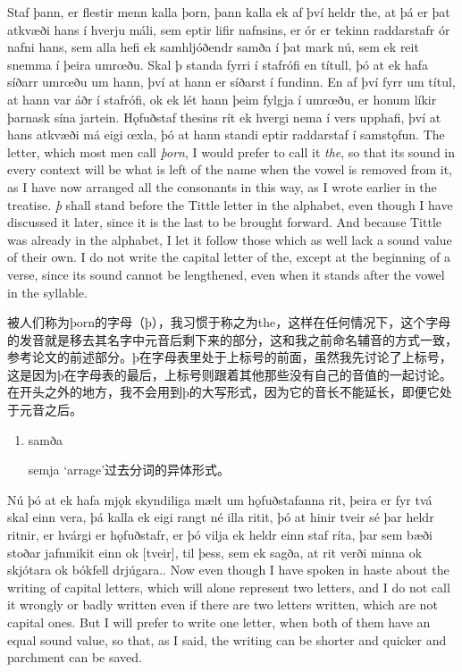 \begin{paracol}{2}
    Staf þann, er flestir menn kalla þorn, þann kalla ek af því heldr the, at þá er þat atkvæði hans í hverju máli, sem eptir lifir nafnsins, er ór er tekinn raddarstafr ór nafni hans, sem alla hefi ek samhljóðendr samða í þat mark nú, sem ek reit snemma í þeira umrœðu. Skal þ standa fyrri í stafrófi en títull, þó at ek hafa síðarr umrœðu um hann, því at hann er síðarst í fundinn. En af því fyrr um títul, at hann var áðr í stafrófi, ok ek lét hann þeim fylgja í umrœðu, er honum líkir þarnask sína jartein. Hǫfuðstaf thesins rít ek hvergi nema í vers upphafi, því at hans atkvæði má eigi œxla, þó at hann standi eptir raddarstaf í samstǫfun.
    \switchcolumn
    The letter, which most men call \textit{þorn}, I would prefer to call it \textit{the}, so that its sound in every context will be what is left of the name when the vowel is removed from it, as I have now arranged all the consonants in this way, as I wrote earlier in the treatise. \textit{þ} shall stand before the Tittle letter in the alphabet, even though I have discussed it later, since it is the last to be brought forward. And because Tittle was already in the alphabet, I let it follow those which as well lack a sound value of their own. I do not write the capital letter of the, except at the beginning of a verse, since its sound cannot be lengthened, even when it stands after the vowel in the syllable.
\end{paracol}
\begin{translation*}{}
    被人们称为þorn的字母（þ），我习惯于称之为the，这样在任何情况下，这个字母的发音就是移去其名字中元音后剩下来的部分，这和我之前命名辅音的方式一致，参考论文的前述部分。þ在字母表里处于上标号的前面，虽然我先讨论了上标号，这是因为þ在字母表的最后，上标号则跟着其他那些没有自己的音值的一起讨论。在开头之外的地方，我不会用到þ的大写形式，因为它的音长不能延长，即便它处于元音之后。
\end{translation*}
\begin{grammar*}{}
    \begin{enumerate}[leftmargin=*]
        \item samða

              semja `arrage'过去分词的异体形式。
    \end{enumerate}
\end{grammar*}
\begin{paracol}{2}
    Nú þó at ek hafa mjǫk skyndiliga mælt um hǫfuðstafanna rit, þeira er fyr tvá skal einn vera, þá kalla ek eigi rangt né illa ritit, þó at hinir tveir sé þar heldr ritnir, er hvárgi er hǫfuðstafr, er þó vilja ek heldr einn staf ríta, þar sem bæði stoðar jafnmikit einn ok [tveir], til þess, sem ek sagða, at rit verði minna ok skjótara ok bókfell drjúgara..
    \switchcolumn
    Now even though I have spoken in haste about the writing of capital letters, which will alone represent two letters, and I do not call it wrongly or badly written even if there are two letters written, which are not capital ones. But I will prefer to write one letter, when both of them have an equal sound value, so that, as I said, the writing can be shorter and quicker and parchment can be saved.
\end{paracol}
